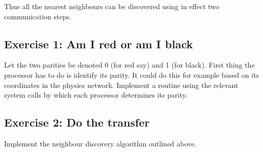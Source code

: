 Thus all the nearest neighbours can be discovered using in effect two
communication steps.

\subsection{Exercise 1: Am I red or am I black} 
Let the two parities be denoted 0 (for red say) and 1 (for black). First
thing the processor has to do is identify its parity. It could do this 
for example based on its coordinates in the physics network. Implement
a routine using the relevant system calls by which each processor determines
its parity.

\subsection{Exercise 2: Do the transfer}
Implement the neighbour discovery algorithm outlined above.
